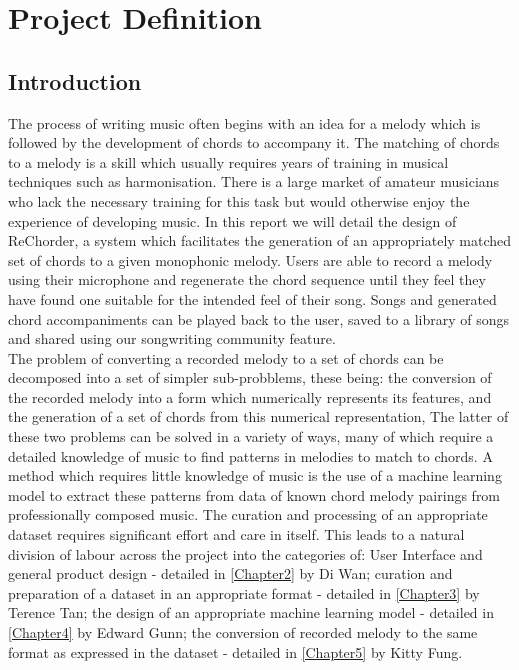 
\chapter{Project Definition} %

\label{Chapter1} %


\section{Introduction}
The process of writing music often begins with an idea for a melody which is followed by the development of chords to accompany it.
The matching of chords to a melody is a skill which usually requires years of training in musical techniques such as harmonisation.
There is a large market of amateur musicians who lack the necessary training for this task but would otherwise enjoy the experience of developing music.  
In this report we will detail the design of ReChorder, a system which facilitates the generation of an appropriately matched set of chords to a given monophonic melody.
Users are able to record a melody using their microphone and regenerate the chord sequence until they feel they have found one suitable for the intended feel of their song.
Songs and generated chord accompaniments can be played back to the user, saved to a library of songs and shared using our songwriting community feature. \\
The problem of converting a recorded melody to a set of chords can be decomposed into a set of simpler sub-probblems, these being:
the conversion of the recorded melody into a form which numerically represents its features,
and the generation of a set of chords from this numerical representation,
The latter of these two problems can be solved in a variety of ways, many of which require a detailed knowledge of music to find patterns in melodies to match to chords.  
A method which requires little knowledge of music is the use of a machine learning model to extract these patterns from data of known chord melody pairings from professionally composed music. 
The curation and processing of an appropriate dataset requires significant effort and care in itself.
This leads to a natural division of labour across the project into the categories of:
\label{sec:Introduction}
User Interface and general product design - detailed in \ref{Chapter2} by Di Wan;
curation and preparation of a dataset in an appropriate format - detailed in \ref{Chapter3} by Terence Tan;
the design of an appropriate machine learning model - detailed in \ref{Chapter4} by Edward Gunn;
the conversion of recorded melody to the same format as expressed in the dataset - detailed in \ref{Chapter5} by Kitty Fung.


